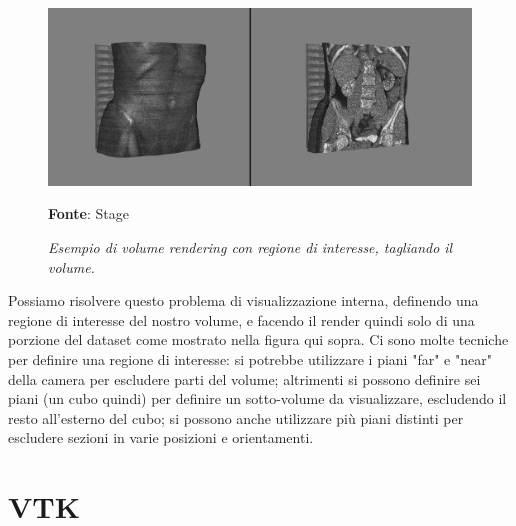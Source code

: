 \begin{figure}[h]
    \centering
    \includegraphics[scale=0.3]{immagini/volumerendering/regionofinterest.png}
    \caption{\textit{Esempio di volume rendering con regione di interesse, tagliando il volume.}}
    \textbf{Fonte}: Stage
    \label{fig: Volume Rendering con Regione di Interesse}
\end{figure}

Possiamo risolvere questo problema di visualizzazione interna, definendo una regione di interesse del nostro volume, e facendo il render quindi solo di una porzione del dataset come mostrato nella figura qui sopra. Ci sono molte tecniche per definire una regione di interesse: si potrebbe utilizzare i piani "far" e "near" della camera per escludere parti del volume; altrimenti si possono definire sei piani (un cubo quindi) per definire un sotto-volume da visualizzare, escludendo il resto all'esterno del cubo; si possono anche utilizzare più piani distinti per escludere sezioni in varie posizioni e orientamenti.

\section{VTK}

